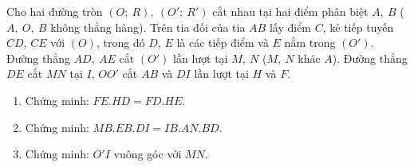 \begin{ex}%
    Cho hai đường tròn $(O;\ R),\ (O';\ R')$ cắt nhau tại hai điểm phân biệt $A,\ B$ ($A,\ O,\ B$ không thẳng hàng). Trên tia đối của tia $AB$ lấy điểm $C$, kẻ tiếp tuyến $CD$, $CE$ với $(O)$, trong đó $D$, $E$ là các tiếp điểm và $E$ nằm trong $(O')$. Đường thẳng $AD,\ AE$ cắt $(O')$ lần lượt tại $M,\ N$ ($M,\ N$ khác $A$). Đường thẳng $DE$ cắt $MN$ tại $I$, $OO'$ cắt $AB$ và $DI$ lần lượt tại $H$ và $F$.
    \begin{enumerate}
        \item Chứng minh: $FE.HD=FD.HE$.
        \item Chứng minh: $MB.EB.DI=IB.AN.BD$.
        \item Chứng minh: $O'I$ vuông góc với $MN$.
           \end{enumerate}
\loigiai
    {
    \begin{center}
\end{center}}
\end{ex}
